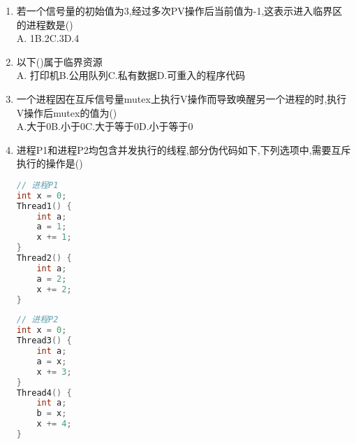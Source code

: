 \documentclass[12pt, a4paper, oneside, UTF8]{ctexbook}
\begin{document}
\begin{enumerate}
    \item 若一个信号量的初始值为3,经过多次PV操作后当前值为-1,这表示进入临界区的进程数是() \\
    A. 1\qquad B.2\qquad C.3\qquad D.4

    \item 以下()属于临界资源 \\
    A. 打印机\qquad B.公用队列\qquad C.私有数据\qquad D.可重入的程序代码 

    \item 一个进程因在互斥信号量mutex上执行V操作而导致唤醒另一个进程的时,执行V操作后mutex的值为() \\
    A.大于0\qquad B.小于0\qquad C.大于等于0\qquad D.小于等于0 

    \item 进程P1和进程P2均包含并发执行的线程,部分伪代码如下,下列选项中,需要互斥执行的操作是() 
    \begin{center}
        \begin{minipage}[t]{0.45\textwidth}
\begin{lstlisting}[language=C]
// 进程P1                    
int x = 0;                   
Thread1() {                  
    int a;
    a = 1;
    x += 1;
}
Thread2() {
    int a;
    a = 2;
    x += 2;
}
\end{lstlisting}
        \end{minipage}
        \hfill
        \begin{minipage}[t]{0.45\textwidth}
\begin{lstlisting}[language=C]
// 进程P2                    
int x = 0;                   
Thread3() {                  
    int a;
    a = x;
    x += 3;
}
Thread4() {
    int a;
    b = x;
    x += 4;
}
\end{lstlisting}
        \end{minipage}
    \end{center}


\end{enumerate}
\end{document}
